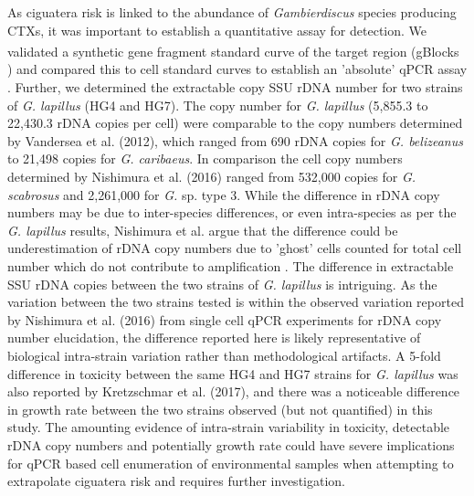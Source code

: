 \documentclass[12pt]{article}
\begin{document}
As ciguatera risk is linked to the abundance of \emph{Gambierdiscus} species producing CTXs, it was important to establish a quantitative assay for detection.
We validated a synthetic gene fragment standard curve of the target region (gBlocks \textsuperscript{\textregistered}) and compared this to cell standard curves to establish an 'absolute' qPCR assay \citep{nishimura2016quantitative,hariganeya2013quantitative}. 
Further, we determined the extractable copy SSU rDNA number for two strains of \emph{G. lapillus} (HG4 and HG7). %
The copy number for \emph{G. lapillus} (5,855.3 to 22,430.3 rDNA copies per cell) %
were comparable to the copy numbers determined by Vandersea et al. (2012), which ranged from 690 rDNA copies for \emph{G. belizeanus} to 21,498 copies for \emph{G. caribaeus}. 
In comparison the cell copy numbers determined by Nishimura et al. (2016) ranged from 532,000 copies for \emph{G. scabrosus} and 2,261,000 for \emph{G.} sp. type 3. While the difference in rDNA copy numbers may be due to inter-species differences, or even intra-species as per the \emph{G. lapillus} results, Nishimura et al. argue that the difference could be underestimation of rDNA copy numbers due to 'ghost' cells counted for total cell number which do not contribute to amplification \citep{nishimura2016quantitative,hariganeya2013quantitative}.
The difference in extractable SSU rDNA copies between the two strains of \emph{G. lapillus} is intriguing. 
As the variation between the two strains tested is within the observed variation reported by Nishimura et al. (2016) from single cell qPCR experiments for rDNA copy number elucidation, the difference reported here is likely representative of biological intra-strain variation rather than methodological artifacts. 
A 5-fold difference in toxicity between the same HG4 and HG7 strains for \emph{G. lapillus} was also reported by Kretzschmar et al. (2017), and there was a noticeable difference in growth rate between the two strains observed (but not quantified) in this study. 
The amounting evidence of intra-strain variability in toxicity, detectable rDNA copy numbers and potentially growth rate could have severe implications for qPCR based cell enumeration of environmental samples when attempting to extrapolate ciguatera risk and requires further investigation.\\
\end{document}
